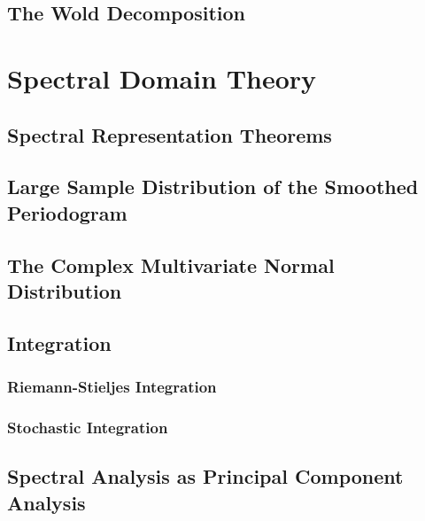 \documentclass[12pt]{article}
\begin{document}
\subsection{The Wold Decomposition} 


\section{Spectral Domain Theory}
\subsection{Spectral Representation Theorems}

\subsection{Large Sample Distribution of the Smoothed Periodogram}

\subsection{The Complex Multivariate Normal Distribution}

\subsection{Integration}
\subsubsection{Riemann-Stieljes Integration}

\subsubsection{Stochastic Integration}

\subsection{Spectral Analysis as Principal Component Analysis}
\end{document}
